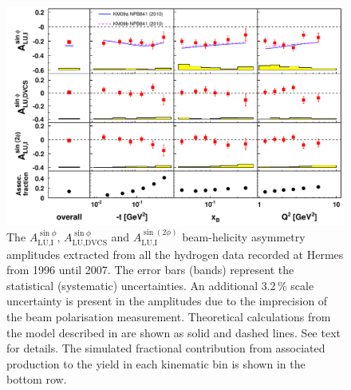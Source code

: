 \begin{figure}
 \begin{center}
 \includegraphics[width=15cm]{bsadvcsplots_eml_par13_bin6_release_all_pic_update}
  \caption{The $A_{\textrm{LU,I}}^{\sin\phi}$, $A_{\textrm{LU,DVCS}}^{\sin\phi}$ and
$A_{\textrm{LU,I}}^{\sin(2\phi)}$ beam-helicity asymmetry amplitudes extracted from all the hydrogen data recorded at H{\sc ermes}
from 1996 until 2007. The error bars (bands) represent the statistical
(systematic) uncertainties. An additional 3.2\,\% scale uncertainty is present in the amplitudes due to the imprecision of
the beam polarisation measurement. Theoretical calculations from the model described in  \cite{Kum09} are shown as solid and dashed lines. See text for details. The simulated fractional contribution from associated production to the yield in each kinematic bin is shown in the bottom row.}
  \label{bsa_xbjrange}
 \end{center}
\end{figure}


